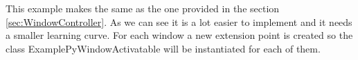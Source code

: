 This example makes the same as the one provided in the section \ref{sec:WindowController}. As we can see it is a lot easier to implement and it needs a smaller learning curve. For each window a new extension point is created so the class ExamplePyWindowActivatable will be instantiated for each of them.



